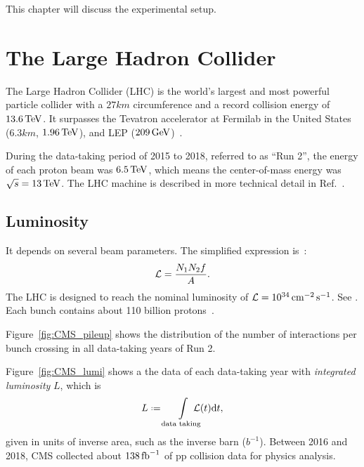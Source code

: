 
 \label{sec:dectector}

This chapter will discuss the experimental setup.




\section{The Large Hadron Collider}

The Large Hadron Collider (LHC) is the world's largest and most powerful particle collider with a $27\unit{km}$ circumference and a record collision energy of $13.6{\,\text{Te\hspace{-.08em}V}}$.
It surpasses the Tevatron accelerator at Fermilab in the United States~\cite{Tevatron} ($6.3\unit{km}$, $1.96{\,\text{Te\hspace{-.08em}V}}$), and LEP ($209{\,\text{Ge\hspace{-.08em}V}}$)~\cite[Section 32]{PDG_2022}.

During the data-taking period of 2015 to 2018, referred to as ``Run 2'', the energy of each proton beam was $6.5{\,\text{Te\hspace{-.08em}V}}$, which means the center-of-mass energy was $\sqrt{s}=13{\,\text{Te\hspace{-.08em}V}}$.
The LHC machine is described in more technical detail in Ref.~\cite{LHC}.

\subsection{Luminosity}\label{sec:lumi}



It depends on several beam parameters. The simplified expression is~\cite[p.~533]{PDG_2022}:
\begin{equation}\label{eq:instant_lumi}
  {\ensuremath{\mathcal{L}}} = \frac{N_1N_2f}{A}.
\end{equation}
The LHC is designed to reach the nominal luminosity of ${\mathcal{L}}=10^{34}{\text{\,cm}}^{-2}{\text{\,s}}^{-1}$.
See .
Each bunch contains about 110 billion protons~\cite{LHC,LHC_lumi_bunches_Run2}.

Figure~\ref{fig:CMS_pileup} shows the distribution of the number of interactions per bunch crossing in all data-taking years of Run 2.

Figure~\ref{fig:CMS_lumi} shows a the data of each data-taking year with \emph{integrated luminosity} $L$, which is
\begin{equation}\label{eq:integrated_lumi}
  L \defeq \int\displaylimits_\text{data taking}\hspace{-4mm}\lumi(t)\text{d}t,
\end{equation}
given in units of inverse area, such as the inverse barn ($\unit{b}^{-1}$).
Between 2016 and 2018, CMS collected about $138{\mbox{\ensuremath{\,\text{fb}^\text{$-$1}}}}$ of pp collision data for physics analysis.


